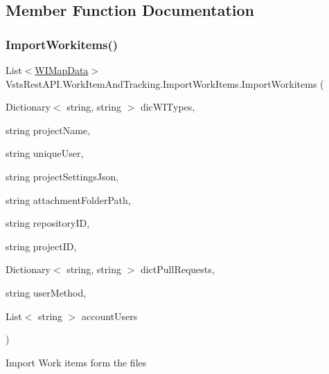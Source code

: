 \subsection{Member Function Documentation}
\mbox{\label{class_vsts_rest_a_p_i_1_1_work_item_and_tracking_1_1_import_work_items_a314f15de4c9b09b3911af9d079abe306}} 
\subsubsection{\texorpdfstring{Import\+Workitems()}{ImportWorkitems()}}
{\footnotesize\ttfamily List$<$\mbox{\hyperlink{class_vsts_rest_a_p_i_1_1_work_item_and_tracking_1_1_w_i_map_data}{W\+I\+Map\+Data}}$>$ Vsts\+Rest\+A\+P\+I.\+Work\+Item\+And\+Tracking.\+Import\+Work\+Items.\+Import\+Workitems (\begin{DoxyParamCaption}\item[{Dictionary$<$ string, string $>$}]{dic\+W\+I\+Types,  }\item[{string}]{project\+Name,  }\item[{string}]{unique\+User,  }\item[{string}]{project\+Settings\+Json,  }\item[{string}]{attachment\+Folder\+Path,  }\item[{string}]{repository\+ID,  }\item[{string}]{project\+ID,  }\item[{Dictionary$<$ string, string $>$}]{dict\+Pull\+Requests,  }\item[{string}]{user\+Method,  }\item[{List$<$ string $>$}]{account\+Users }\end{DoxyParamCaption})}



Import Work items form the files 


